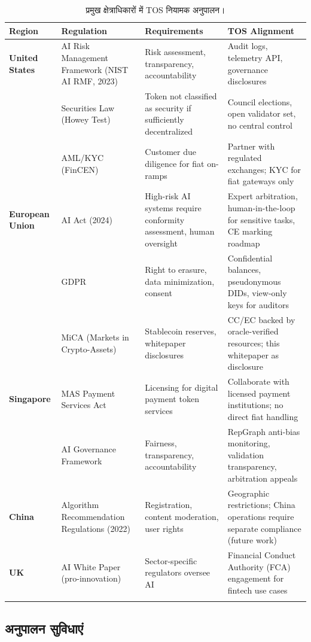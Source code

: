\documentclass[11pt]{article}
\begin{document}
\begin{itemize}[noitemsep]
\begin{itemize}[noitemsep]
\begin{itemize}[noitemsep]
\begin{itemize}[noitemsep]
\begin{itemize}[noitemsep]
\begin{longtable}{@{}p{}p{}p{}p{}@{}}
\toprule
\textbf{Region} & \textbf{Regulation} & \textbf{Requirements} & \textbf{TOS Alignment} \\\midrule
\textbf{United States} & AI Risk Management Framework (NIST AI RMF, 2023) & Risk assessment, transparency, accountability & Audit logs, telemetry API, governance disclosures \\
 & Securities Law (Howey Test) & Token not classified as security if sufficiently decentralized & Council elections, open validator set, no central control \\
 & AML/KYC (FinCEN) & Customer due diligence for fiat on-ramps & Partner with regulated exchanges; KYC for fiat gateways only \\
\textbf{European Union} & AI Act (2024) & High-risk AI systems require conformity assessment, human oversight & Expert arbitration, human-in-the-loop for sensitive tasks, CE marking roadmap \\
 & GDPR & Right to erasure, data minimization, consent & Confidential balances, pseudonymous DIDs, view-only keys for auditors \\
 & MiCA (Markets in Crypto-Assets) & Stablecoin reserves, whitepaper disclosures & CC/EC backed by oracle-verified resources; this whitepaper as disclosure \\
\textbf{Singapore} & MAS Payment Services Act & Licensing for digital payment token services & Collaborate with licensed payment institutions; no direct fiat handling \\
 & AI Governance Framework & Fairness, transparency, accountability & RepGraph anti-bias monitoring, validation transparency, arbitration appeals \\
\textbf{China} & Algorithm Recommendation Regulations (2022) & Registration, content moderation, user rights & Geographic restrictions; China operations require separate compliance (future work) \\
\textbf{UK} & AI White Paper (pro-innovation) & Sector-specific regulators oversee AI & Financial Conduct Authority (FCA) engagement for fintech use cases \\
\bottomrule
\caption{प्रमुख क्षेत्राधिकारों में TOS नियामक अनुपालन।}
\end{longtable}

\subsection{अनुपालन सुविधाएं}


\end{itemize}
\end{itemize}
\end{itemize}
\end{itemize}
\end{itemize}
\end{document}
